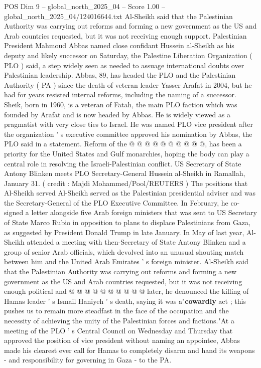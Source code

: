 \begin{textsample}{POS Dim 9 – global\_north\_2025\_04 – Score 1.00 – global\_north\_2025\_04/124016644.txt}  \label{ex:f9_pos_421}
Al-Sheikh said that the Palestinian Authority was carrying out reforms and forming a new government as the US and Arab countries requested, but it was not receiving enough support.
Palestinian President Mahmoud Abbas named close confidant Hussein al-Sheikh as his deputy and likely successor on Saturday, the Palestine Liberation Organization ( PLO ) said, a step widely seen as needed to assuage international doubts over Palestinian leadership.
Abbas, 89, has headed the PLO and the Palestinian Authority ( PA ) since the death of veteran leader Yasser Arafat in 2004, but he had for years resisted internal reforms, including the naming of a successor.
Sheik, born in 1960, is a veteran of Fatah, the main PLO faction which was founded by Arafat and is now headed by Abbas.
He is widely viewed as a pragmatist with very close ties to Israel.
He was named PLO vice president after the organization ' s executive committee approved his nomination by Abbas, the PLO said in a statement.
Reform of the @ @ @ @ @ @ @ @ @ @, has been a priority for the United States and Gulf monarchies, hoping the body can play a central role in resolving the Israeli-Palestinian conflict.
US Secretary of State Antony Blinken meets PLO Secretary-General Hussein al-Sheikh in Ramallah, January 31. ( credit : Majdi Mohammed/Pool/REUTERS ) The positions that Al-Sheikh served Al-Sheikh served as the Palestinian presidential adviser and was the Secretary-General of the PLO Executive Committee.
In February, he co-signed a letter alongside five Arab foreign ministers that was sent to US Secretary of State Marco Rubio in opposition to plans to displace Palestinians from Gaza, as suggested by President Donald Trump in late January.
In May of last year, Al-Sheikh attended a meeting with then-Secretary of State Antony Blinken and a group of senior Arab officials, which devolved into an unusual shouting match between him and the United Arab Emirates ' s foreign minister.
Al-Sheikh said that the Palestinian Authority was carrying out reforms and forming a new government as the US and Arab countries requested, but it was not receiving enough political and @ @ @ @ @ @ @ @ @ @ later, he denounced the killing of Hamas leader ' s Ismail Haniyeh ' s death, saying it was a"\textbf{cowardly} act ; this pushes us to remain more steadfast in the face of the occupation and the necessity of achieving the unity of the Palestinian forces and factions."At a meeting of the PLO ' s Central Council on Wednesday and Thursday that approved the position of vice president without naming an appointee, Abbas made his clearest ever call for Hamas to completely disarm and hand its weapons - and responsibility for governing in Gaza - to the PA.

\end{textsample}
